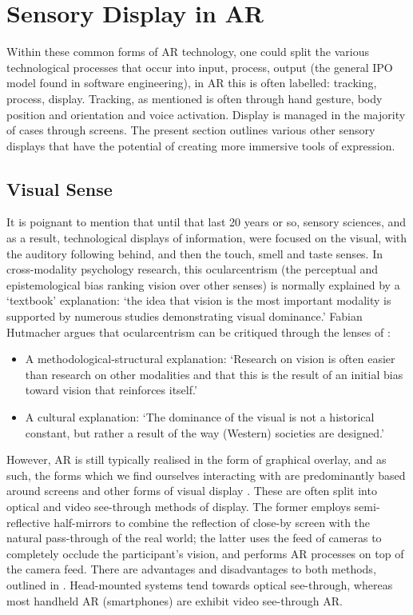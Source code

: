 \section{Sensory Display in AR}\label{sec: ar-sensory}
Within these common forms of AR technology, one could split the various technological processes that occur into input, process, output (the general IPO model found in software engineering), in AR this is often labelled: tracking, process, display. Tracking, as mentioned is often through hand gesture, body position and orientation and voice activation. Display is managed in the majority of cases through screens. The present section outlines various other sensory displays that have the potential of creating more immersive tools of expression.

\subsection{Visual Sense}\label{sec: ar-sensory-visual}
It is poignant to mention that until that last 20 years or so, sensory sciences, and as a result, technological displays of information, were focused on the visual, with the auditory following behind, and then the touch, smell and taste senses. In cross-modality psychology research, this ocularcentrism (the perceptual and epistemological bias ranking vision over other senses) is normally explained by a `textbook' explanation: `the idea that vision is the most important modality is supported by numerous studies demonstrating visual dominance.' Fabian Hutmacher argues that ocularcentrism can be critiqued through the lenses of \citeyearpar{hutmacher2019}: 

\begin{itemize}
    \item A methodological-structural explanation: `Research on vision is often easier than research on other modalities and that this is the result of an initial bias toward vision that reinforces itself.'
    \item A cultural explanation: `The dominance of the visual is not a historical constant, but rather a result of the way (Western) societies are designed.'
\end{itemize}

However, AR is still typically realised in the form of graphical overlay, and as such, the forms which we find ourselves interacting with are predominantly based around screens and other forms of visual display \citep{dey2018}. These are often split into optical and video see-through methods of display. The former employs semi-reflective half-mirrors to combine the reflection of close-by screen with the natural pass-through of the real world; the latter uses the feed of cameras to completely occlude the participant's vision, and performs AR processes on top of the camera feed. There are advantages and disadvantages to both methods, outlined in \citep{rolland2000}. Head-mounted systems tend towards optical see-through, whereas most handheld AR (smartphones) are exhibit video see-through AR.

